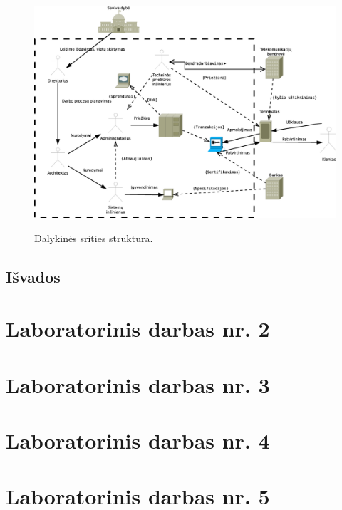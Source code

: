 \documentclass[10pt]{IEEEtran}
\begin{document}
            \begin{figure}[t]
                \includegraphics{figures/struktura.eps}
                \label{fig:struktura}
                \caption{Dalykinės srities struktūra.}
            \end{figure}

        \subsection{Išvados}

    \section{Laboratorinis darbas nr. 2}

    \section{Laboratorinis darbas nr. 3}

    \section{Laboratorinis darbas nr. 4}

    \section{Laboratorinis darbas nr. 5}
\end{document}
